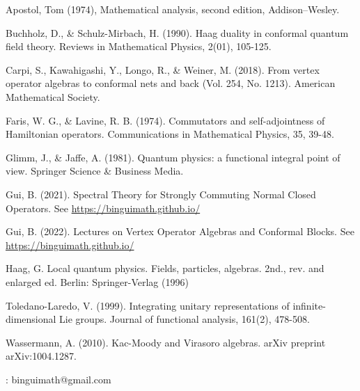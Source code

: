 \documentclass[12pt,b5paper,notitlepage]{article}
\theoremstyle{definition}
\theoremstyle{plain}
\numberwithin{equation}{section}
\begin{document}
\newpage



\printindex


\begin{thebibliography}{999999}
\footnotesize	

Apostol, Tom (1974), Mathematical analysis, second edition, Addison–Wesley.


Buchholz, D., \& Schulz-Mirbach, H. (1990). Haag duality in conformal quantum field theory. Reviews in Mathematical Physics, 2(01), 105-125.


Carpi, S., Kawahigashi, Y., Longo, R., \& Weiner, M. (2018). From vertex operator algebras to conformal nets and back (Vol. 254, No. 1213). American Mathematical Society.


Faris, W. G., \& Lavine, R. B. (1974). Commutators and self-adjointness of Hamiltonian operators. Communications in Mathematical Physics, 35, 39-48.


Glimm, J., \& Jaffe, A. (1981). Quantum physics: a functional integral point of view. Springer Science \& Business Media.


Gui, B. (2021). Spectral Theory for Strongly Commuting Normal Closed Operators. See \href{https://binguimath.github.io/}{https://binguimath.github.io/}

Gui, B. (2022). Lectures on Vertex Operator Algebras and Conformal Blocks. See \href{https://binguimath.github.io/}{https://binguimath.github.io/}


Haag, G. Local quantum physics. Fields, particles, algebras. 2nd., rev. and enlarged ed. Berlin: Springer-Verlag (1996)

Toledano-Laredo, V. (1999). Integrating unitary representations of infinite-dimensional Lie groups. Journal of functional analysis, 161(2), 478-508.

Wassermann, A. (2010). Kac-Moody and Virasoro algebras. arXiv preprint arXiv:1004.1287.







\end{thebibliography}

: binguimath@gmail.com
\end{document}
